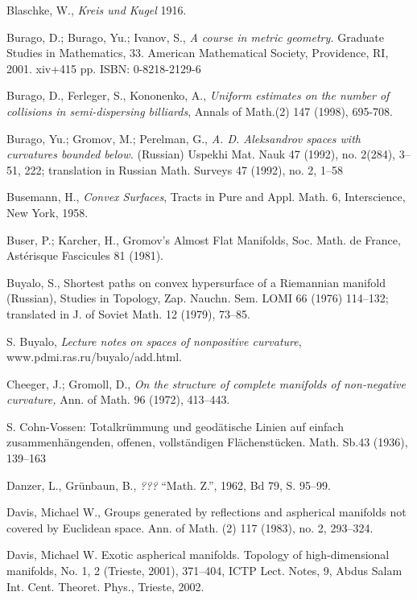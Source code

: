 \begin{thebibliography}{52}
 Blaschke, W., \textit{Kreis und Kugel} 1916.

 Burago, D.; Burago, Yu.; Ivanov, S., \textit{A course in metric geometry.} Graduate Studies in Mathematics, 33. American Mathematical Society, Providence, RI, 2001. xiv+415 pp. ISBN: 0-8218-2129-6

Burago, D., Ferleger, S., Kononenko, A.,
\textit{Uniform estimates on the number of collisions in semi-dispersing
billiards},
Annals of Math.(2) 147 (1998), 695-708.


 Burago, Yu.; Gromov, M.; Perelman, G., \textit{A. D. Aleksandrov spaces
with curvatures bounded below.} (Russian)  Uspekhi Mat. Nauk  47  (1992),  no.
2(284), 3--51, 222;  translation in  Russian Math. Surveys  47  (1992),  no. 2, 1--58

 Busemann, H., \textit{Convex Surfaces}, Tracts in Pure and Appl. Math. 6, Interscience, New York, 1958.

 Buser, P.; Karcher, H.,
Gromov's Almost Flat Manifolds,
Soc. Math. de France, Ast\'erisque Fascicules
81 (1981). 

 Buyalo, S., Shortest paths on convex
hypersurface of a Riemannian manifold (Russian), Studies in Topology, Zap. Nauchn. Sem.
LOMI 66 (1976) 114--132; translated in J. of Soviet Math. 12 (1979), 73--85.

S. Buyalo,
{\em Lecture notes on spaces of nonpositive curvature},
www.pdmi.ras.ru/buyalo/add.html.


  Cheeger, J.;  Gromoll, D., \textit{On the structure of complete manifolds of non-negative curvature,} Ann. of Math. 96 (1972), 413--443.


 S. Cohn-Vossen: Totalkr\"ummung und geod\"atische Linien auf einfach zusammenh\"angenden, offenen, vollst\"andigen Fl\"achenst\"ucken. Math. Sb.43 (1936), 139--163

Danzer, L., Gr\"unbaun, B., \textit{???} ``Math. Z.'',
1962, Bd 79, S. 95--99.

Davis, Michael W., Groups generated by reflections and aspherical manifolds not covered by Euclidean space.
Ann. of Math. (2) 117 (1983), no. 2, 293--324. 

 Davis, Michael W. Exotic aspherical manifolds. Topology of high-dimensional manifolds, No. 1, 2 (Trieste, 2001), 371--404, ICTP Lect. Notes, 9, Abdus Salam Int. Cent. Theoret. Phys., Trieste, 2002.


\end{thebibliography}
